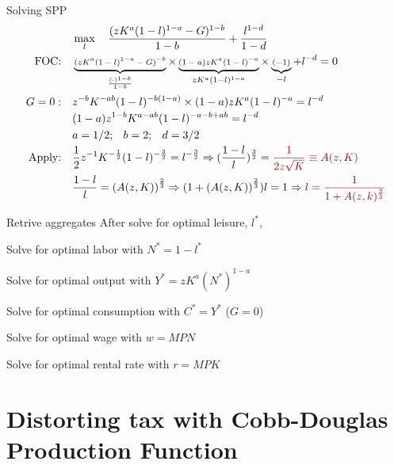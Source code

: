 \documentclass[11pt,aspectratio=169,usenames,dvipsnames]{beamer}
\newcommand{\red}[1]{\textcolor{red}{#1}}
\let\tempa\enumerate
\let\tempb\endenumerate
\renewenvironment{enumerate}{\tempa\addtolength{\itemsep}{\fill}}{\tempb}
\begin{document}
\begin{frame}{Solving SPP}
\label{slide:Solving_SPP}
\begin{align}
        & \max_{l} \quad \frac{(z K^{a} ( 1-l )^{1-a} - G)^{1-b}}{1-b} + \frac{l^{1-d}}{1-d}
    \\
    \text{FOC:} \quad
        & \scriptsize
            \underbrace{( z  K^{a}( 1-l )^{1-a} - G )^{-b}}_{ \frac{( \cdot )^{1-b}}{1-b}}
            \times \underbrace{( 1-a )z K^{a}( 1-l )^{-a}}_{ zK^{a}( 1-l )^{1-a}}
            \times \underbrace{( -1 )}_{-l}
            + l^{-d} = 0
    \\
    G = 0 : \quad
        & \scriptsize
            z^{-b}K^{-ab}( 1-l )^{-b(1-a)} \times ( 1-a ) zK^{a}( 1-l )^{-a} = l^{-d}
    \\
        & \scriptsize
            ( 1-a ) z^{1-b} K^{a-ab} ( 1-l )^{-a - b+ a b} = l^{-d}
    \\
        & \scriptsize
            a = 1/2; \quad b = 2; \quad d = 3/2
    \\
    \text{Apply:} \quad
        & \scriptsize
            \frac{1}{2} z^{-1} K^{-\frac{1}{2}} ( 1-l )^{-\frac{3}{2}} = l^{-\frac{3}{2}} \Rightarrow ( \frac{1-l}{l} )^{ \frac{3}{2}} = \red{\frac{1}{2z \sqrt{K}} \equiv A(z, K)}
    \\
        & \scriptsize
        \frac{1-l}{l} = \left( A(z, K) \right)^{\frac{2}{3}} \Rightarrow (1 + \left( A(z, K) \right)^{\frac{2}{3}}) l = 1 \Rightarrow \red{l = \frac{1}{1 + A(z, k)^{\frac{2}{3}}}}
\end{align}
\end{frame}

\begin{frame}{Retrive aggregates}
\label{slide:Retrive_aggregates}
After solve for optimal leisure, $ l^{*} $,
    \begin{enumerate}
        \item Solve for optimal labor with $ N^{*} = 1 - l^{*} $
        \item Solve for optimal output with $ Y^{*} = z K^{a} (N^{*})^{1-a} $
        \item Solve for optimal consumption with $ C^{*} = Y^{*} $ ($G = 0$)
        \item Solve for optimal wage with $ w = MPN $
        \item Solve for optimal rental rate with $ r = MPK $
    \end{enumerate}
\end{frame}

\section{Distorting tax with Cobb-Douglas Production Function}
\label{sec:Distorting_tax_with_Cobb_Douglas_Production_Function}
\end{document}
